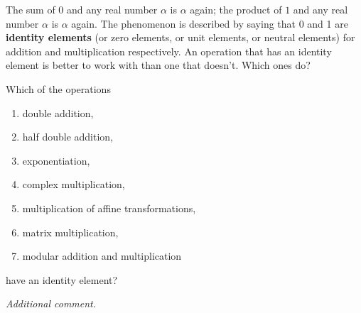 The sum of $0$ and any real number $\alpha$ is $\alpha$ again; the product of $1$ and any real number $\alpha$ is $\alpha$ again. The phenomenon is described by saying that 0 and 1 are \textbf{identity elements} (or zero elements, or unit elements, or neutral elements) for addition and multiplication respectively. An operation that has an identity element is better to work with than one that doesn't. Which ones do?

\begin{problem}
Which of the operations
\begin{enumerate}
    \item double addition,
    \item half double addition,
    \item exponentiation,
    \item complex multiplication,
    \item multiplication of affine transformations,
    \item matrix multiplication,
    \item modular addition and multiplication
\end{enumerate}
have an identity element?
\end{problem}

\textit{Additional comment.}

